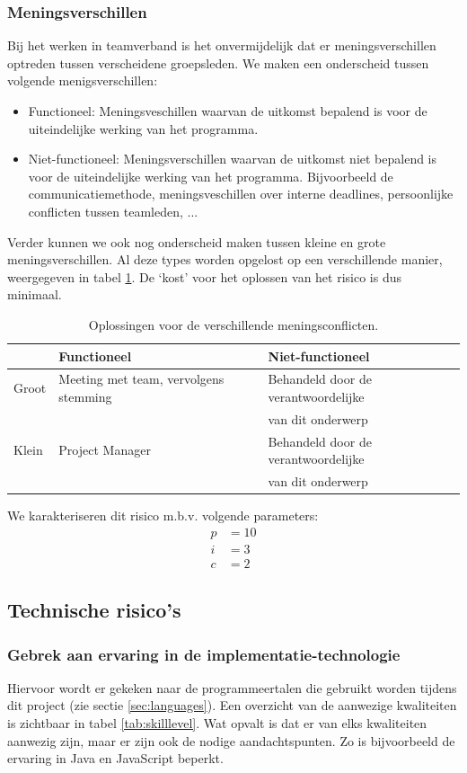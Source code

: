 \subsubsection{Meningsverschillen}
Bij het werken in teamverband is het onvermijdelijk dat er meningsverschillen optreden tussen verscheidene groepsleden. We maken een onderscheid tussen volgende menigsverschillen:
\begin{itemize}
	\item Functioneel: Meningsveschillen waarvan de uitkomst bepalend is voor de uiteindelijke werking van het programma.
	\item Niet-functioneel: Meningsverschillen waarvan de uitkomst niet bepalend is voor de uiteindelijke werking van het programma. Bijvoorbeeld de communicatiemethode, meningsveschillen over interne deadlines, persoonlijke conflicten tussen teamleden, ...
\end{itemize}
Verder kunnen we ook nog onderscheid maken tussen kleine en grote meningsverschillen. Al deze types worden opgelost op een verschillende manier, weergegeven in tabel \ref{tab:meningsverschillen}. De `kost' voor het oplossen van het risico is dus minimaal.
\begin{table} [H]
	\centering
	\caption{Oplossingen voor de verschillende meningsconflicten.}
	\begin{tabular} {l|ll}
					& Functioneel 								& Niet-functioneel \\
			\hline
			Groot 	& Meeting met team, vervolgens stemming		& Behandeld door de verantwoordelijke \\ 
			& & van dit onderwerp \\
			Klein 	& Project Manager							& Behandeld door de verantwoordelijke \\
			& & van dit onderwerp
	\end{tabular}
	\label{tab:meningsverschillen}
\end{table}
We karakteriseren dit risico m.b.v. volgende parameters:
\begin{align*}
	p &= 10\\
	i &= 3\\
	c &= 2
\end{align*}

\subsection{Technische risico's}
\subsubsection{Gebrek aan ervaring in de implementatie-technologie}
Hiervoor wordt er gekeken naar de programmeertalen die gebruikt worden tijdens dit project (zie sectie \ref{sec:languages}). Een overzicht van de aanwezige kwaliteiten is zichtbaar in tabel \ref{tab:skilllevel}. Wat opvalt is dat er van elks kwaliteiten aanwezig zijn, maar er zijn ook de nodige aandachtspunten. Zo is bijvoorbeeld de ervaring in Java en JavaScript beperkt.

